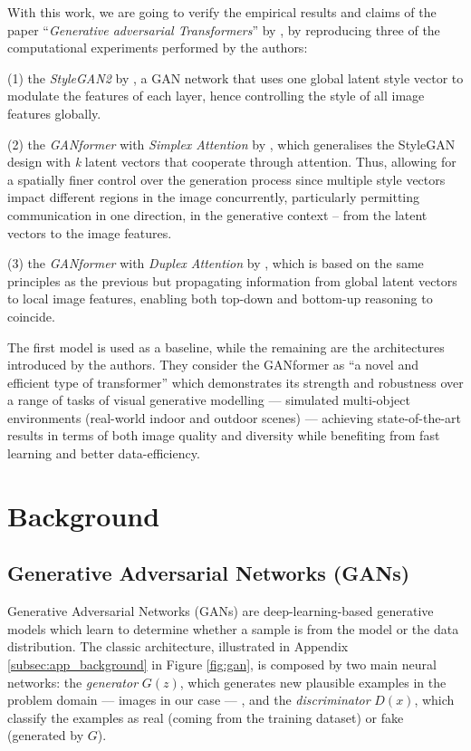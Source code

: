 \documentclass{article}
\begin{document}
	With this work, we are going to verify the empirical results and claims of the paper 
	``\emph{Generative adversarial Transformers}'' by \citet{hudson2021generative}, by reproducing 
	three of the computational experiments performed by the authors:
	\begin{enumerate*}
		\item[(1)] the \textit{StyleGAN2} by \citet{karras2020analyzing,karras2019style}, a GAN 
		network that uses one global latent style vector to modulate the features of each layer, hence 
		controlling the style of all image features globally.
		\item[(2)] the \textit{GANformer} with \textit{Simplex Attention} by 
		\citet{hudson2021generative}, which generalises the StyleGAN design with \textit{k} latent 
		vectors that cooperate through attention. Thus, allowing for a spatially finer control over the 
		generation 
		process since multiple style vectors impact different regions in the image concurrently, 
		particularly 
		permitting communication in one direction, in the generative context – from the latent vectors to 
		the 
		image features.
		\item[(3)] the \textit{GANformer} with \textit{Duplex Attention} by \citet{hudson2021generative}, 
		which is based on the same principles as the previous but propagating information from 
		global latent vectors to local image features, enabling both top-down and bottom-up reasoning to 
		coincide.
	\end{enumerate*} 
	
	The first model is used as a baseline, while the remaining are the architectures introduced by the 
	authors. 
	They consider the GANformer as “a novel and efficient type of transformer” which demonstrates its 
	strength 
	and robustness over a range of tasks of visual generative modelling — simulated multi-object 
	environments 
	(real-world indoor and outdoor scenes) — achieving state-of-the-art results in terms of both image 
	quality 
	and diversity while benefiting from fast learning and better data-efficiency.
	
	\section{Background}\label{sec:background}
	\subsection{Generative Adversarial Networks (GANs)}\label{sec:gan}
	Generative Adversarial Networks (GANs) \cite{goodfellow2014generative} are deep-learning-based 
	generative models which learn to determine whether a sample is from the model or the data 
	distribution. 
	The classic architecture, illustrated in Appendix \ref{subsec:app_background} in Figure 
	\ref{fig:gan}, is 
	composed by two main neural networks: 
	the \textit{generator} ${G(z)}$, which generates new plausible examples in the problem domain — 
	images in our case — , and the \textit{discriminator} ${D(x)}$, which classify the examples as 
	real (coming from the training dataset) or fake (generated by $G$). 
	
\end{document}
